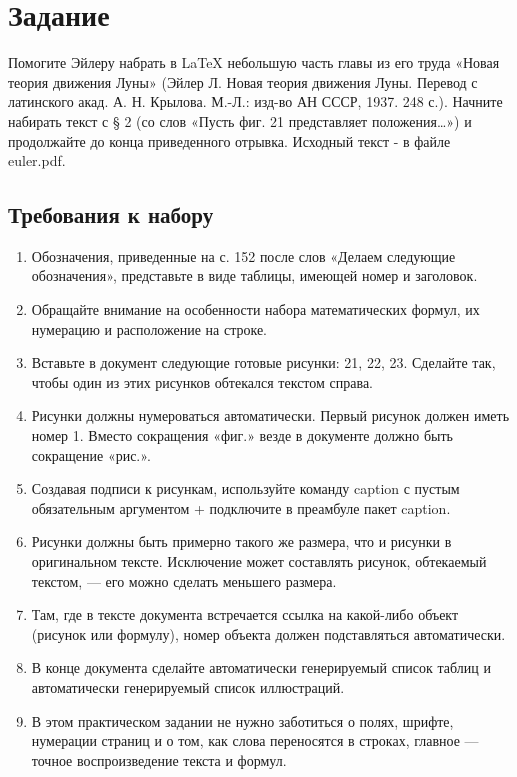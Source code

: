 \documentclass[a4paper,12pt]{article}
\begin{document}
\section*{Задание}

Помогите Эйлеру набрать в LaTeX небольшую часть главы из его труда «Новая теория движения Луны» (Эйлер Л. Новая теория движения Луны. Перевод с латинского акад. А. Н. Крылова. М.-Л.: изд-во АН СССР, 1937. 248 с.). Начните набирать текст с § 2 (со слов «Пусть фиг. 21 представляет положения…») и продолжайте до конца приведенного отрывка. Исходный текст - в файле euler.pdf.
\smallskip

\subsection*{Требования к набору}

\begin{enumerate}
    \item Обозначения, приведенные на с. 152 после слов «Делаем следующие обозначения», представьте в виде таблицы, имеющей номер и заголовок.
    \item Обращайте внимание на особенности набора математических формул, их нумерацию и расположение на строке.
    \item Вставьте в документ следующие готовые рисунки: 21, 22, 23. Сделайте так, чтобы один из этих рисунков обтекался текстом справа.
    \item Рисунки должны нумероваться автоматически. Первый рисунок должен иметь номер 1. Вместо сокращения «фиг.» везде в документе должно быть сокращение «рис.».
    \item Создавая подписи к рисункам, используйте команду caption с пустым обязательным аргументом + подключите в преамбуле пакет caption.
    \item Рисунки должны быть примерно такого же размера, что и рисунки в оригинальном тексте. Исключение может составлять рисунок, обтекаемый текстом, — его можно сделать меньшего размера.
    \item Там, где в тексте документа встречается ссылка на какой-либо объект (рисунок или формулу), номер объекта должен подставляться автоматически.
    \item В конце документа сделайте автоматически генерируемый список таблиц и автоматически генерируемый список иллюстраций.
    \item В этом практическом задании не нужно заботиться о полях, шрифте, нумерации страниц и о том, как слова переносятся в строках, главное — точное воспроизведение текста и формул.
\end{enumerate}
\end{document}
